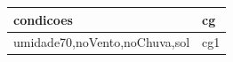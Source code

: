 \documentclass[12pt]{article}
\begin{document}
\begin{table}[H]
\centering
{}
\begin{tabular}{|l|l|}
\hline
\textbf{condicoes}         & \textbf{cg} \\ \hline
umidade70,noVento,noChuva,sol & cg1         \\ \hline
\end{tabular}
\end{table}



\end{document}
